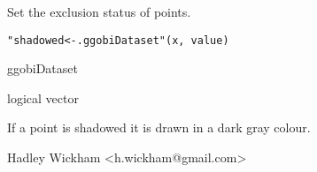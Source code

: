 \documentclass{article}
\begin{document}
\begin{Description}\relax
Set the exclusion status of points.
\end{Description}
\begin{Usage}
\begin{verbatim}"shadowed<-.ggobiDataset"(x, value)\end{verbatim}
\end{Usage}
\begin{Arguments}
\begin{ldescription}
\item[\code{x}] ggobiDataset
\item[\code{value}] logical vector
\end{ldescription}
\end{Arguments}
\begin{Details}\relax
If a point is shadowed it is drawn in a dark gray colour.
\end{Details}
\begin{Author}\relax
Hadley Wickham <h.wickham@gmail.com>
\end{Author}
\begin{SeeAlso}\relax
{}
\end{SeeAlso}
\begin{Examples}
\begin{ExampleCode}\end{ExampleCode}
\end{Examples}
\end{document}
